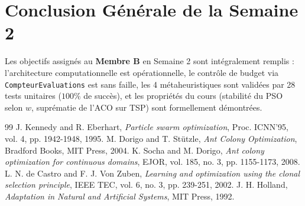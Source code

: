 \documentclass[11pt,a4paper]{article}
\begin{document}
\section{Conclusion Générale de la Semaine 2}
Les objectifs assignés au \textbf{Membre B} en Semaine 2 sont intégralement remplis : l'architecture computationnelle est opérationnelle, le contrôle de budget via \texttt{CompteurEvaluations} est sans faille, les 4 métaheuristiques sont validées par 28 tests unitaires ($100\%$ de succès), et les propriétés du cours (stabilité du PSO selon $w$, suprématie de l'ACO sur TSP) sont formellement démontrées.

\begin{thebibliography}{99}\setlength{\itemsep}{0.1em}
 J. Kennedy and R. Eberhart, \emph{Particle swarm optimization}, Proc. ICNN'95, vol. 4, pp. 1942-1948, 1995.
 M. Dorigo and T. Stützle, \emph{Ant Colony Optimization}, Bradford Books, MIT Press, 2004.
 K. Socha and M. Dorigo, \emph{Ant colony optimization for continuous domains}, EJOR, vol. 185, no. 3, pp. 1155-1173, 2008.
 L. N. de Castro and F. J. Von Zuben, \emph{Learning and optimization using the clonal selection principle}, IEEE TEC, vol. 6, no. 3, pp. 239-251, 2002.
 J. H. Holland, \emph{Adaptation in Natural and Artificial Systems}, MIT Press, 1992.
\end{thebibliography}

\label{LastPage}
\end{document}
